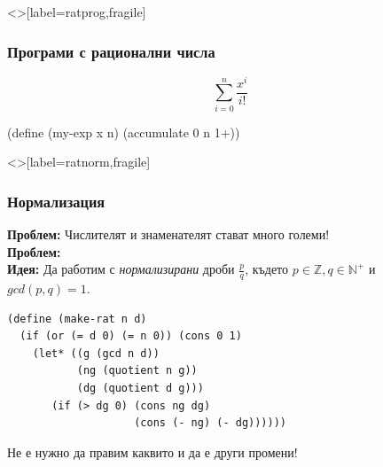 \documentclass[alsotrans,beameroptions={aspectratio=169}]{beamerswitch}
\begin{document}
\begin{frame}<>[label=ratprog,fragile]
  \frametitle{Програми с рационални числа}

  \begin{equation*}
    \sum_{i=0}^n \frac{x^i}{i!}
  \end{equation*}

  \onslide<+->

  \begin{overprint}
\begin{semiverbatim}
(define (my-exp x n)
  (accumulate
      0 n
     1+))
\end{semiverbatim}
  \end{overprint}
\end{frame}

\begin{frame}<>[label=ratnorm,fragile]
  \frametitle{Нормализация}

  \textbf{Проблем:} Числителят и знаменателят стават много големи!\\[2ex]
  \pause
  \textbf{Проблем:} \\[2ex]
  \pause
  \textbf{Идея:} Да работим с \emph{нормализирани} дроби $\frac p q$, където $p \in \mathbb Z, q \in \mathbb N^+$ и $gcd(p,q) = 1$.
  \pause
\begin{lstlisting}
(define (make-rat n d)
  (if (or (= d 0) (= n 0)) (cons 0 1)
    (let* ((g (gcd n d))
           (ng (quotient n g))
           (dg (quotient d g)))
       (if (> dg 0) (cons ng dg)
                    (cons (- ng) (- dg))))))
\end{lstlisting}
  \pause
  \alert{Не е нужно да правим каквито и да е други промени!}
\end{frame}



\end{document}
